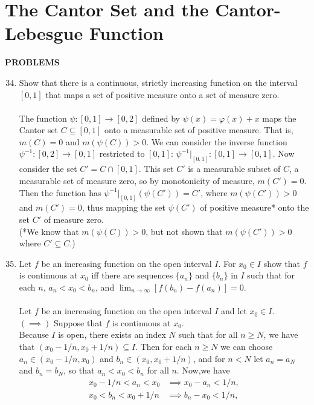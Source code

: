 \section{The Cantor Set and the Cantor-Lebesgue Function}
\begin{center}
	\textbf{PROBLEMS}
\end{center}
\begin{enumerate}
	\setcounter{enumi}{33}
	\item Show that there is a continuous, strictly increasing function on the interval $[0,1]$ that maps a set of positive measure onto a set of measure zero.\\
	\\The function $\psi:[0,1]\to[0,2]$ defined by $\psi(x)=\varphi(x)+x$ maps the Cantor set $C\subseteq[0,1]$ onto a measurable set of positive measure.
	That is, $m(C)=0$ and $m(\psi(C))>0$.
	We can consider the inverse function $\psi^{-1}:[0,2]\to[0,1]$ restricted to $[0,1]$: $\psi^{-1}|_{[0,1]}:[0,1]\to[0,1]$.
	Now consider the set $C'=C\cap[0,1]$. This set $C'$ is a measurable subset of $C$, a measurable set of measure zero, so by monotonicity of measure, $m(C')=0$.
	Then the function has $\psi^{-1}|_{[0,1]}(\psi(C'))=C'$, where $m(\psi(C'))>0$ and $m(C')=0$, thus mapping the set $\psi(C')$ of positive measure* onto the set $C'$ of measure zero.\\
	(*We know that  $m(\psi(C))>0$, but not shown that $m(\psi(C'))>0$ where $C'\subseteq C$.)
	\item Let $f$ be an increasing function on the open interval $I$. For $x_0\in I$ show that $f$ is continuous at $x_0$ iff there are sequences $\{a_n\}$ and $\{b_n\}$ in $I$ such that for each $n$, $a_n<x_0<b_n$, and $\lim_{n\to\infty}[f(b_n)-f(a_n)]=0$.\\
	\\Let $f$ be an increasing function on the open interval $I$ and let $x_0\in I$.\\
	$(\implies)$ Suppose that $f$ is continuous at $x_0$.\\
	Because $I$ is open, there exists an index $N$ such that for all $n\ge N$, we have that $(x_0-1/n,x_0+1/n)\subseteq I$.
	Then for each $n\ge N$ we can choose $a_n\in(x_0-1/n,x_0)$ and $b_n\in(x_0,x_0+1/n)$, and for $n<N$ let $a_n=a_N$ and $b_n=b_N$, so that $a_n<x_0<b_n$ for all $n$.
	Now,we have
	\begin{align*}
		x_0-1/n<a_n<x_0&\implies x_0-a_n<1/n,\\
		x_0<b_n<x_0+1/n&\implies b_n-x_0<1/n,
	\end{align*}

\end{enumerate}
